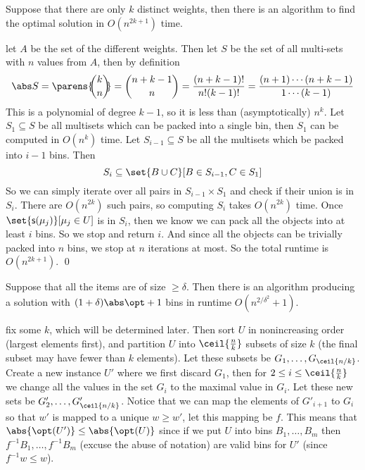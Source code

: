 \blemm

    Suppose that there are only $k$ distinct weights, then there is an algorithm to find the optimal solution in $O(n^{2k+1})$ time.

\elemm

\Proof let $A$ be the set of the different weights.
Then let $S$ be the set of all multi-sets with $n$ values from $A$, then by definition
$$ \abs S = \parens{\!\!\binom kn\!\!} = \binom{n+k-1}n = \frac{(n+k-1)!}{n!(k-1)!} = \frac{(n+1)\cdots(n+k-1)}{1\cdots(k-1)} $$
This is a polynomial of degree $k-1$, so it is less than (asymptotically) $n^k$.
Let $S_1\subseteq S$ be all multisets which can be packed into a single bin, then $S_1$ can be computed in $O(n^k)$ time.
Let $S_{i-1}\subseteq S$ be all the multisets which be packed into $i-1$ bins.
Then
$$ S_i \subseteq \set{B\cup C}[B\in S_{i-1},C\in S_1] $$
So we can simply iterate over all pairs in $S_{i-1}\times S_1$ and check if their union is in $S_i$.
There are $O(n^{2k})$ such pairs, so computing $S_i$ takes $O(n^{2k})$ time.
Once $\set{\s s(\mu_j)}[\mu_j\in U]$ is in $S_i$, then we know we can pack all the objects into at least $i$ bins.
So we stop and return $i$.
And since all the objects can be trivially packed into $n$ bins, we stop at $n$ iterations at most.
So the total runtime is $O(n^{2k+1})$.
\qed

\blemm[name=largeelements]

    Suppose that all the items are of size $\geq\delta$.
    Then there is an algorithm producing a solution with $(1+\delta)\abs\opt+1$ bins in runtime $O(n^{2/\delta^2}+1)$.

\elemm

\Proof fix some $k$, which will be determined later.
Then sort $U$ in nonincreasing order (largest elements first), and partition $U$ into $\ceil{\frac nk}$ subsets of size $k$ (the final subset may have fewer than $k$ elements).
Let these subsets be $G_1,\dots,G_{\ceil{n/k}}$.
Create a new instance $U'$ where we first discard $G_1$, then for $2\leq i\leq\ceil{\frac nk}$ we change all the values in the set $G_i$ to the maximal value in $G_i$.
Let these new sets be $G'_2,\dots,G'_{\ceil{n/k}}$.
Notice that we can map the elements of $G'_{i+1}$ to $G_i$ so that $w'$ is mapped to a unique $w\geq w'$, let this mapping be $f$.
This means that $\abs{\opt(U')}\leq\abs{\opt(U)}$ since if we put $U$ into bins $B_1,\dots,B_m$ then $f^{-1}B_1,\dots,f^{-1}B_m$ (excuse the abuse of notation) are valid bins for $U'$ (since
$f^{-1}w\leq w$).

